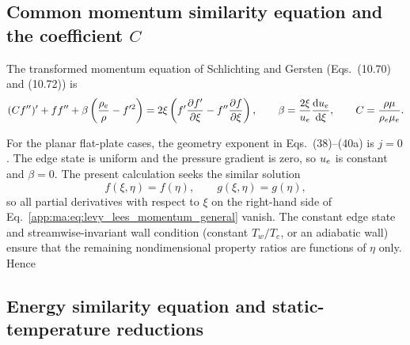 \subsection{Common momentum similarity equation and the coefficient \texorpdfstring{\(C\)}{C}}
\label{app:ma:subsec:derv_momentum_similarity}

The transformed momentum equation of Schlichting and Gersten (Eqs.~(10.70) and (10.72)) is
\begin{equation}
  (Cf'')'+ff''
  +\beta\left(\frac{\rho_e}{\rho}-f'^2\right)
  =2\xi\left(
    f'\frac{\partial f'}{\partial\xi}
    -f''\frac{\partial f}{\partial\xi}
  \right),
  \qquad
  \beta=\frac{2\xi}{u_e}\frac{\mathrm{d}u_e}{\mathrm{d}\xi},
  \qquad
  C=\frac{\rho\mu}{\rho_e\mu_e}.
  \label{app:ma:eq:levy_lees_momentum_general}
\end{equation}

For the planar \maAppName{} flat-plate cases, the geometry exponent in Eqs.~(38)--(40a) is \(j=0\). The edge state is uniform and the pressure gradient is zero, so \(u_e\) is constant and \(\beta=0\). The present calculation seeks the similar solution
\begin{equation}
  f(\xi,\eta)=f(\eta),
  \qquad
  g(\xi,\eta)=g(\eta),
  \label{app:ma:eq:similarity_ansatz}
\end{equation}
so all partial derivatives with respect to \(\xi\) on the right-hand side of Eq.~\eqref{app:ma:eq:levy_lees_momentum_general} vanish. The constant edge state and streamwise-invariant wall condition (constant \(T_w/T_e\), or an adiabatic wall) ensure that the remaining nondimensional property ratios are functions of \(\eta\) only. Hence


\subsection{Energy similarity equation and static-temperature reductions}
\label{app:ma:subsec:derv_imperfect_energy_similarity}

